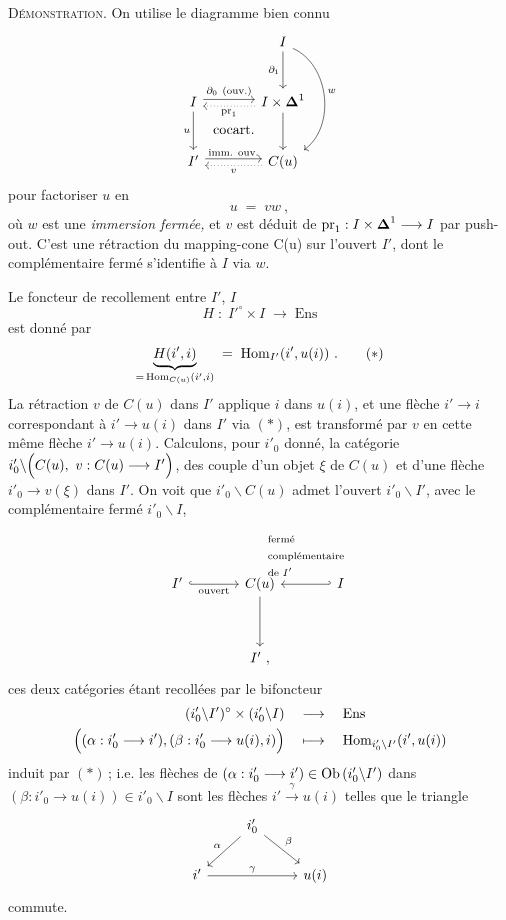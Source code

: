 \textsc{Démonstration.} On utilise le diagramme bien connu
\[
\begin{tikzcd}[row sep=large, column sep=large]
 & I \arrow[d, "\partial_1"'] \arrow[dd, bend left=60, "w"] \\
I \arrow[r, shift left, "\partial_0\ (\text{ouv.})"] \arrow[d, "u"'] \arrow[dr, phantom, "\text{cocart.}"] & I\times\boldsymbol{\Delta}^1 \arrow[l, dotted, shift left, "\pr_1"] \arrow[d] \\
I' \arrow[r, shift left, "\text{imm. ouv.}"] & C(u) \arrow[l, dotted, shift left, "v"]
\end{tikzcd}
\]
pour factoriser $u$ en
\[
u \;=\; vw\ ,
\]
où $w$ est une \textit{immersion fermée,} et $v$ est déduit de $\mathrm{pr}_1 : I\times\boldsymbol{\Delta}^1 \longrightarrow I$ par push-out. C'est une rétraction du mapping-cone C(u) sur l'ouvert $I'$, dont le complémentaire fermé s'identifie à $I$ via $w$.

Le foncteur de recollement entre $I'$, $I$
\[
H \;:\; I'^\circ\times I \;\longrightarrow\; \mathrm{Ens}
\]
est donné par
\[
\underbrace{H(i',i)}_{=\,\Hom_{C(u)}(i',i)} \;=\; \Hom_{I'}(i',u(i))\ . \tag*{$(*)$}
\]
La rétraction $v$ de $C(u)$ dans $I'$ applique $i$ dans $u(i)$, et une flèche $i'\longrightarrow i$ correspondant à $i'\longrightarrow u(i)$ dans $I'$ via $(*)$, est transformé par $v$ en cette même flèche $i'\longrightarrow u(i)$. Calculons, %
pour $i'_0$ donné, la catégorie $i'_0\backslash\Bigl(C(u),\ v : C(u)\longrightarrow I'\Bigr)$, des couple d'un objet $\xi$ de $C(u)$ %
et d'une flèche $i'_0\longrightarrow v(\xi)$ dans $I'$. On voit que $i'_0\backslash C(u)$ admet l'ouvert $i'_0\backslash I'$, avec le complémentaire fermé $i'_0\backslash I$,
\[
\begin{tikzcd}[column sep=large, row sep=huge]
I' \arrow[r, hook, "\text{ouvert}"'] & C(u) \arrow[d] & I \arrow[l, hook', "\begin{array}{l}\text{fermé}\\ \text{complémentaire}\\ \text{de } I'\end{array}"'] \\
 & I'\ ,
\end{tikzcd}
\]
ces deux catégories étant recollées par le bifoncteur
\[
\begin{aligned}
(i'_0\backslash I')^\circ \times (i'_0\backslash I) &\quad\longrightarrow\quad \mathrm{Ens}\\
\Bigl((\alpha : i'_0\longrightarrow i'), (\beta : i'_0\longrightarrow u(i), i)\Bigr) &\quad\longmapsto\quad \operatorname{Hom}_{i'_0\backslash I'}(i',u(i))
\end{aligned}
\]
induit par $(*)$\,; i.e. les flèches de $(\alpha : i'_0\longrightarrow i') \in \operatorname{Ob}\,(i'_0\backslash I')$ dans $(\beta : i'_0\longrightarrow u(i)) \in i'_0\backslash I$ sont les flèches $i' \xrightarrow{\gamma} u(i)$ telles que le triangle
\[
\begin{tikzcd}
 & i'_0 \arrow[dl, "\alpha"'] \arrow[dr, "\beta"] & \\
i' \arrow[rr, "\gamma"] & & u(i)
\end{tikzcd}
\]
commute.

